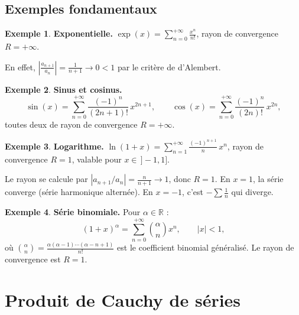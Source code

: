 \documentclass[12pt,a4paper,openany]{book}
\theoremstyle{definition}
\newtheorem{exemple}{Exemple}[chapter]
\newcommand{\R}{\mathbb{R}}
\newcommand{\abs}[1]{\left\lvert #1 \right\rvert}
\begin{document}
\subsection{Exemples fondamentaux}

\begin{exemple}\label{ex:serie-exp}
  \textbf{Exponentielle.} $\displaystyle\exp(x) = \sum_{n=0}^{+\infty} \frac{x^n}{n!}$,
  rayon de convergence $R = +\infty$.

  En effet, $\abs{\frac{a_{n+1}}{a_n}} = \frac{1}{n+1} \to 0 < 1$ par le critère de d'Alembert.
\end{exemple}

\begin{exemple}\label{ex:serie-sin-cos}
  \textbf{Sinus et cosinus.}
  \[
    \sin(x) = \sum_{n=0}^{+\infty} \frac{(-1)^n}{(2n+1)!}\,x^{2n+1}, \qquad
    \cos(x) = \sum_{n=0}^{+\infty} \frac{(-1)^n}{(2n)!}\,x^{2n},
  \]
  toutes deux de rayon de convergence $R = +\infty$.
\end{exemple}

\begin{exemple}\label{ex:serie-ln}
  \textbf{Logarithme.} $\displaystyle\ln(1+x) = \sum_{n=1}^{+\infty} \frac{(-1)^{n+1}}{n}\,x^n$,
  rayon de convergence $R = 1$, valable pour $x \in \,]-1, 1]$.

  Le rayon se calcule par $\abs{a_{n+1}/a_n} = \frac{n}{n+1} \to 1$, donc $R = 1$.
  En $x = 1$, la série converge (série harmonique alternée). En $x = -1$, c'est $-\sum \frac{1}{n}$
  qui diverge.
\end{exemple}

\begin{exemple}\label{ex:serie-binomiale}
  \textbf{Série binomiale.} Pour $\alpha \in \R$ :
  \[
    (1+x)^\alpha = \sum_{n=0}^{+\infty} \binom{\alpha}{n} x^n, \qquad \abs{x} < 1,
  \]
  où $\binom{\alpha}{n} = \frac{\alpha(\alpha-1)\cdots(\alpha-n+1)}{n!}$ est le coefficient
  binomial généralisé. Le rayon de convergence est $R = 1$.
\end{exemple}

\section{Produit de Cauchy de séries}\label{sec:series:produit-cauchy}
\end{document}

